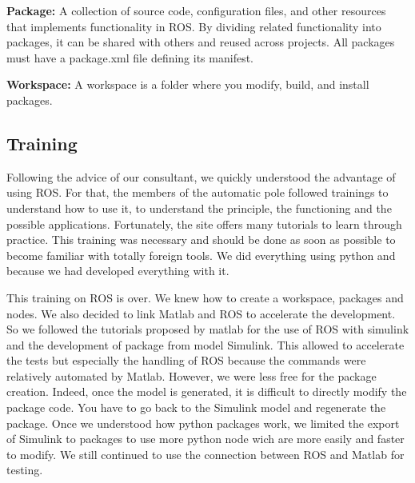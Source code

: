 \bigbreak
\textbf{Package:} A collection of source code, configuration files, and other resources that implements functionality in ROS. By dividing related functionality into packages, it can be shared with others and reused across projects. All packages must have a package.xml file defining its manifest.

\bigbreak
\textbf{Workspace:} A workspace is a folder where you modify, build, and install packages.

\subsection{Training}

Following the advice of our consultant, we quickly understood the advantage of using ROS. For that, the members of the automatic pole followed trainings to understand how to use it, to understand the principle, the functioning and the possible applications. Fortunately, the site offers many tutorials to learn through practice. This training was necessary and should be done as soon as possible to become familiar with totally foreign tools. We did everything using python and because we had developed everything with it. 

\bigbreak
This training on ROS is over. We knew how to create a workspace, packages and nodes. We also decided to link Matlab and ROS to accelerate the development. So we followed the tutorials proposed by matlab for the use of ROS with simulink and the development of package from model Simulink. This allowed to accelerate the tests but especially the handling of ROS because the commands were relatively automated by Matlab. However, we were less free for the package creation. Indeed, once the model is generated, it is difficult to directly modify the package code. You have to go back to the Simulink model and regenerate the package. Once we understood how python packages work, we limited the export of Simulink to packages to use more python node wich are more easily and faster to modify. We still continued to use the connection between ROS and Matlab for testing.

